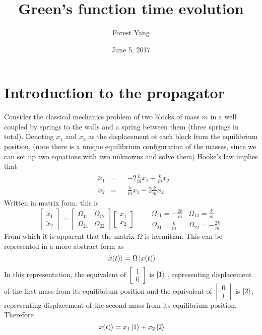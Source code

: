\documentclass{article}
\title{Green's function time evolution}
\author{Forest Yang}
\date{June 5, 2017}
\begin{document}
\let\tb\textbf
\maketitle
\section{Introduction to the propagator} 
Consider the classical mechanics problem of two blocks of mass $m$ in a well coupled by springs to the walls and a spring between them (three springs in total). Denoting $x_1$ and $x_2$ as the displacement of each block from the equilibrium position, (note there is a unique equilibrium configuration of the masses, since we can set up two equations with two unknowns and solve them) Hooke's law implies that
\begin{align*}
\begin{aligned}
& \ddot{x}_1 & = && -2\frac{k}{m}x_1 + \frac{k}{m}x_2 \\
& \ddot{x}_2 & = && \frac{k}{m}x_1 - 2\frac{k}{m}x_2  
\end{aligned}
\end{align*}
Written in matrix form, this is 
\[
\begin{bmatrix} \ddot{x}_1 \\ \ddot{x}_2 \end{bmatrix} = \begin{bmatrix} \Omega_{11} & \Omega_{12} \\ \Omega_{21} & \Omega_{22} \end{bmatrix} 
\begin{bmatrix} x_1 \\ x_2 \end{bmatrix} \qquad \begin{array}{ll} \Omega_{11} = -\frac{2k}{m} & \Omega_{12} = \frac{k}{m} \\ \Omega_{21} = \frac{k}{m} & \Omega_{22} = -\frac{2k}{m} \end{array}
\]
From which it is apparent that the matrix $\Omega$ is hermitian. This can be represented in a more abstract form as \begin{equation*} \ket{\ddot{x}(t)} = \Omega\ket{x(t)} \end{equation*}
In this representation, the equivalent of $\begin{bmatrix} 1 \\ 0 \end{bmatrix}$ is $\ket{1}$ , representing displacement of the first mass from its equilibrium position and the equivalent of $\begin{bmatrix} 0 \\ 1 \end{bmatrix}$ is $\ket{2}$, representing displacement of the second mass from its equilibrium position. Therefore \begin{equation*} \ket{x(t)} = x_1\ket{1} + x_2 \ket{2} \end{equation*}
\end{document}
